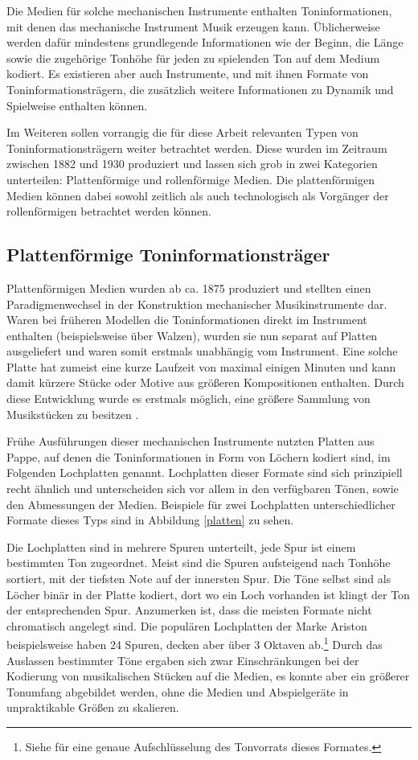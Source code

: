 Die Medien für solche mechanischen Instrumente enthalten Toninformationen, mit denen das mechanische Instrument Musik erzeugen kann.
Üblicherweise werden dafür mindestens grundlegende Informationen wie der Beginn, die Länge sowie die zugehörige Tonhöhe für jeden zu spielenden Ton auf dem Medium kodiert.
Es existieren aber auch Instrumente, und mit ihnen Formate von Toninformationsträgern, die zusätzlich weitere Informationen zu Dynamik und Spielweise enthalten können.

Im Weiteren sollen vorrangig die für diese Arbeit relevanten Typen von Toninformationsträgern weiter betrachtet werden.
Diese wurden im Zeitraum zwischen 1882 und 1930 produziert und lassen sich grob in zwei Kategorien unterteilen: Plattenförmige und rollenförmige Medien.
Die plattenförmigen Medien können dabei sowohl zeitlich als auch technologisch als Vorgänger der rollenförmigen betrachtet werden können.

\subsection{Plattenförmige Toninformationsträger}

Plattenförmigen Medien wurden ab ca. 1875 produziert und stellten einen Paradigmenwechsel in der Konstruktion mechanischer Musikinstrumente dar.
Waren bei früheren Modellen die Toninformationen direkt im Instrument enthalten (beispielsweise über Walzen), wurden sie nun separat auf Platten ausgeliefert und waren somit erstmals unabhängig vom Instrument.
Eine solche Platte hat zumeist eine kurze Laufzeit von maximal einigen Minuten und kann damit kürzere Stücke oder Motive aus größeren Kompositionen enthalten.
Durch diese Entwicklung wurde es erstmals möglich, eine größere Sammlung von Musikstücken zu besitzen \parencite[III.5.c. Plattenspieldosen und Drehinstrumente]{mgg_mechanische}.

Frühe Ausführungen dieser mechanischen Instrumente nutzten Platten aus Pappe, auf denen die Toninformationen in Form von Löchern kodiert sind, im Folgenden Lochplatten genannt.
Lochplatten dieser Formate sind sich prinzipiell recht ähnlich und unterscheiden sich vor allem in den verfügbaren Tönen, sowie den Abmessungen der Medien.
Beispiele für zwei Lochplatten unterschiedlicher Formate dieses Typs sind in Abbildung \ref{platten} zu sehen.

Die Lochplatten sind in mehrere Spuren unterteilt, jede Spur ist einem bestimmten Ton zugeordnet.
Meist sind die Spuren aufsteigend nach Tonhöhe sortiert, mit der tiefsten Note auf der innersten Spur.
Die Töne selbst sind als Löcher binär in der Platte kodiert, dort wo ein Loch vorhanden ist klingt der Ton der entsprechenden Spur.
Anzumerken ist, dass die meisten Formate nicht chromatisch angelegt sind.
Die populären Lochplatten der Marke Ariston beispielsweise haben 24 Spuren, decken aber über 3 Oktaven ab.\footnote{Siehe \textcite[]{mxp_2003520} für eine genaue Aufschlüsselung des Tonvorrats dieses Formates.}
Durch das Auslassen bestimmter Töne ergaben sich zwar Einschränkungen bei der Kodierung von musikalischen Stücken auf die Medien, es konnte aber ein größerer Tonumfang abgebildet werden, ohne die Medien und Abspielgeräte in unpraktikable Größen zu skalieren.

